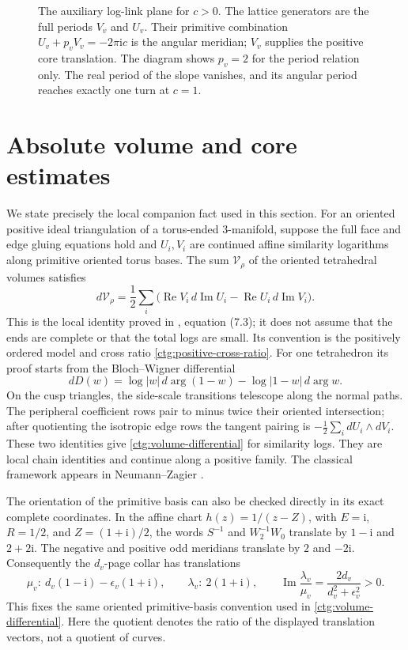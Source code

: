 \documentclass[11pt]{article}
\numberwithin{equation}{section}
\theoremstyle{definition}
\theoremstyle{remark}
\newcommand{\ii}{\mathrm i}
\newcommand{\Rea}{\operatorname{Re}}
\newcommand{\Ima}{\operatorname{Im}}
\begin{document}
\begin{figure}[t]
\centering

\caption{The auxiliary log-link plane for $c>0$. The lattice generators
are the full periods $V_v$ and $U_v$. Their primitive combination
$U_v+p_vV_v=-2\pi\ii c$ is the angular meridian; $V_v$ supplies the
positive core translation. The diagram shows $p_v=2$ for the period
relation only. The real period of the slope vanishes, and its angular
period reaches exactly one turn at $c=1$.}
\label{ctg:period-figure}
\end{figure}

\section{Absolute volume and core estimates}
\label{ctg:regulator}

We state precisely the local companion fact used in this section.
For an oriented positive ideal triangulation of a torus-ended
3-manifold, suppose the full face and edge gluing equations hold and
$U_i,V_i$ are continued affine similarity logarithms along primitive
oriented torus bases. The sum $\mathcal V_\rho$ of the oriented
tetrahedral volumes satisfies
\begin{equation}\label{ctg:volume-differential}
 d\mathcal V_\rho=\frac12\sum_i
   \bigl(\Rea V_i\,d\Ima U_i-\Rea U_i\,d\Ima V_i\bigr).
\end{equation}
This is the local identity proved in \cite[Section~7]{MarkedFillings},
equation (7.3); it does not assume that the
ends are complete or that the total logs are small. Its convention is
the positively ordered model and cross ratio
\eqref{ctg:positive-cross-ratio}. For one tetrahedron its proof starts
from the Bloch--Wigner differential
\[
 dD(w)=\log|w|\,d\arg(1-w)-\log|1-w|\,d\arg w.
\]
On the cusp triangles, the side-scale transitions telescope along the
normal paths. The peripheral coefficient rows pair to minus
twice their oriented intersection; after quotienting the isotropic
edge rows the tangent pairing is $-\tfrac12\sum_i dU_i\wedge dV_i$.
These two identities give \eqref{ctg:volume-differential} for similarity
logs. They are local chain identities and continue along a positive
family. The classical framework appears in Neumann--Zagier
\cite{NeumannZagier}.

The orientation of the primitive basis can also be checked directly
in its exact complete coordinates. In the affine chart
$h(z)=1/(z-Z)$, with $E=\ii$, $R=1/2$, and $Z=(1+\ii)/2$, the
words $S^{-1}$ and $W_2^{-1}W_0$ translate by $1-\ii$ and
$2+2\ii$. The negative and positive odd meridians translate by
$2$ and $-2\ii$. Consequently the $d_v$-page collar has translations
\[
 \mu_v:\ d_v(1-\ii)-\epsilon_v(1+\ii),\qquad
 \lambda_v:\ 2(1+\ii),\qquad
 \Ima\frac{\lambda_v}{\mu_v}
             =\frac{2d_v}{d_v^2+\epsilon_v^2}>0.
\]
This fixes the same oriented primitive-basis convention used in
\eqref{ctg:volume-differential}. Here the quotient denotes the ratio
of the displayed translation vectors, not a quotient of curves.
\end{document}
